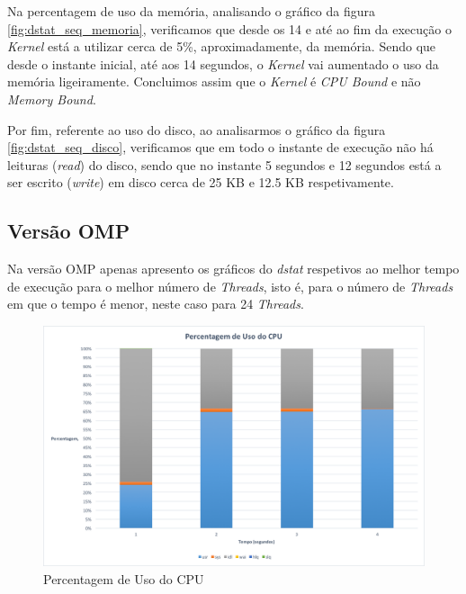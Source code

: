 \documentclass[conference,compsoc]{IEEEtran}
\begin{document}
Na percentagem de uso da memória, analisando o gráfico da figura \ref{fig:dstat_seq_memoria}, verificamos que desde os 14 e até ao fim da execução o \textit{Kernel} está a utilizar cerca de 5\%, aproximadamente, da memória. Sendo que desde o instante inicial, até aos 14 segundos, o \textit{Kernel} vai aumentado o uso da memória ligeiramente. Concluimos assim que o  \textit{Kernel} é \textit{CPU Bound} e não \textit{Memory Bound}. 

Por fim, referente ao uso do disco, ao analisarmos o gráfico da figura \ref{fig:dstat_seq_disco}, verificamos que em todo o instante de execução não há leituras (\textit{read}) do disco, sendo que no instante 5 segundos e 12 segundos está a ser escrito (\textit{write}) em disco cerca de 25 KB e 12.5 KB respetivamente.

\subsection{Versão OMP}
Na versão OMP apenas apresento os gráficos do \textit{dstat} respetivos ao melhor tempo de execução para o melhor número de \textit{Threads}, isto é, para o número de \textit{Threads} em que o tempo é menor, neste caso para 24 \textit{Threads}.

\begin{figure}[h!]
\centering
\includegraphics[scale=0.325]{dstat/OMP/dstat_omp_cpu.png}
\caption{Percentagem de Uso do CPU}
\label{fig:dstat_omp_cpu}
\end{figure}
\end{document}
